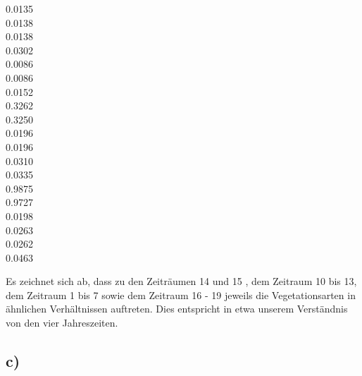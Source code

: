 0.0135      \\
0.0138      \\
0.0138      \\
0.0302      \\
0.0086      \\
0.0086      \\
0.0152      \\
0.3262      \\
0.3250      \\
0.0196      \\
0.0196      \\
0.0310      \\
0.0335      \\
0.9875      \\
0.9727      \\
0.0198      \\
0.0263      \\
0.0262      \\
0.0463      

\hfill



Es zeichnet sich ab, dass zu den Zeiträumen 14 und 15 , dem Zeitraum 10 bis 13, dem Zeitraum 1 bis 7 sowie dem Zeitraum 16 - 19 jeweils die Vegetationsarten in ähnlichen Verhältnissen auftreten.
Dies entspricht in etwa unserem Verständnis von den vier Jahreszeiten.

\subsection*{c)}

